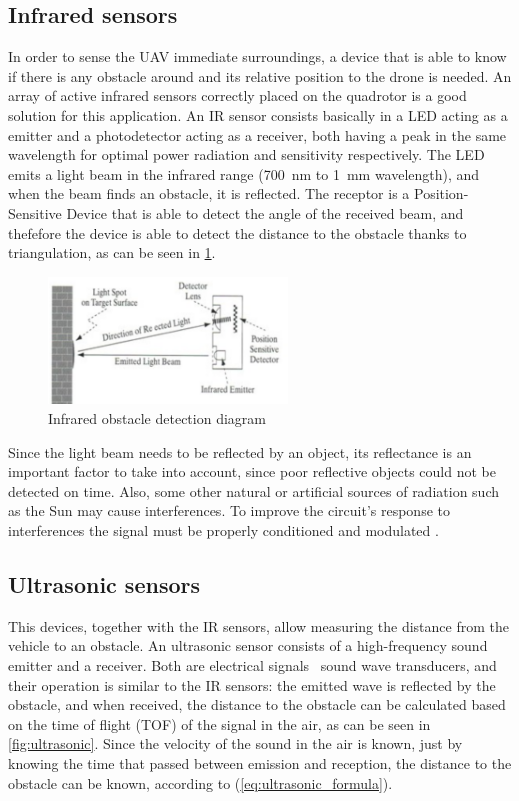 \documentclass[journal]{IEEEtran}
\begin{document}
		\subsection{Infrared sensors}
		In order to sense the UAV immediate surroundings, a device that is able to know if there is any obstacle around and its relative position to the drone is needed. An array of active infrared sensors correctly placed on the quadrotor is a good solution for this application. An IR sensor consists basically in a LED acting as a emitter and a photodetector acting as a receiver, both having a peak in the same wavelength for optimal power radiation and sensitivity respectively. The LED emits a light beam in the infrared range (\SI{700}{\nano \meter} to \SI{1}{\milli \meter} wavelength), and when the beam finds an obstacle, it is reflected. The receptor is a Position-Sensitive Device that is able to detect the angle of the received beam, and thefefore the device is able to detect the distance to the obstacle thanks to triangulation, as can be seen in \figurename\ref{fig:ir}.
		\begin{figure}[h]
			\centering
			\includegraphics[width=2.5in]{ir}
			\caption{Infrared obstacle detection diagram}
			\label{fig:ir}
		\end{figure}
		Since the light beam needs to be reflected by an object, its reflectance is an important factor to take into account, since poor reflective objects could not be detected on time.  Also, some other natural or artificial sources of radiation such as the Sun may cause interferences. To improve the circuit's response to interferences the signal must be properly conditioned and modulated \cite{mod_control_bresciani, remotecontrol}.
		
		\subsection{Ultrasonic sensors}
		This devices, together with the IR sensors, allow measuring the distance from the vehicle to an obstacle. An ultrasonic sensor consists of a high-frequency sound emitter and a receiver. Both are electrical signals \textendash \ sound wave transducers, and their operation is similar to the IR sensors: the emitted wave is reflected by the obstacle, and when received, the distance to the obstacle can be calculated based on the time of flight (TOF) of the signal in the air, as can be seen in \figurename \ref{fig:ultrasonic}. Since the velocity of the sound in the air is known, just by knowing the time that passed between emission and reception, the distance to the obstacle can be known, according to (\ref{eq:ultrasonic_formula}). 
		
\end{document}
